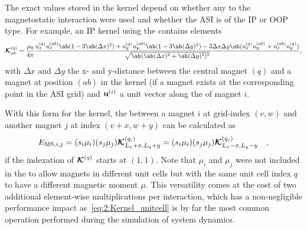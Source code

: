 The exact values stored in the kernel depend on whether any  to the magnetostatic interaction were used and whether the ASI is of the IP or OOP type.
For example, an IP kernel using the  contains elements
\begin{equation}
	\label{eq:2:Kernel_detailed}
	\vc{\mathcal{K}}^{(q)}_{ab} = \frac{\mu_0}{4 \pi} \frac{
		u_x^{(q)} u_x^{(ab)} \ab(1 - 3 \ab(\Delta x)^2) + u_y^{(q)} u_y^{(ab)} \ab(1 - 3 \ab(\Delta y)^2) - 3\Delta x \Delta y \ab(u_x^{(q)} u_y^{(ab)} + u_x^{(ab)} u_y^{(q)})
	}{
		\sqrt{\ab(\ab(\Delta x)^2 + \ab(\Delta y)^2)^5}
	} \mathrm{,}
\end{equation}
with $\Delta x$ and $\Delta y$ the x- and y-distance between the central magnet $(q)$ and a magnet at position $(ab)$ in the kernel (if a magnet exists at the corresponding point in the ASI grid) and $\boldsymbol{\mathbf{u}}^{(i)}$ a unit vector along the  of magnet $i$. \par
With this form for the kernel, the  between a magnet $i$ at grid-index $(v,w)$ and another magnet $j$ at index $(v+x, w+y)$ can be calculated as
\begin{equation}
	\label{eq:2:Kernel_unitcell}
	E_{\mathrm{MS},i,j} = (s_i \mu_i) (s_j \mu_j) \boldsymbol{\mathbf{\mathcal{K}}}^{(q_i)}_{L_x+x, L_y+y} = (s_i \mu_i) (s_j \mu_j) \boldsymbol{\mathbf{\mathcal{K}}}^{(q_j)}_{L_x-x, L_y-y} \quad \mathrm{,}
\end{equation}
if the indexation of $\boldsymbol{\mathbf{\mathcal{K}}}^{(q)}$ starts at $(1,1)$.
Note that $\mu_i$ and $\mu_j$ were not included in the  to allow magnets in different unit cells but with the same unit cell index $q$ to have a different magnetic moment $\mu$.
This versatility comes at the cost of two additional element-wise multiplications per interaction, which has a non-negligible performance impact as~\cref{eq:2:Kernel_unitcell} is by far the most common operation performed during the simulation of system dynamics. \\\par

